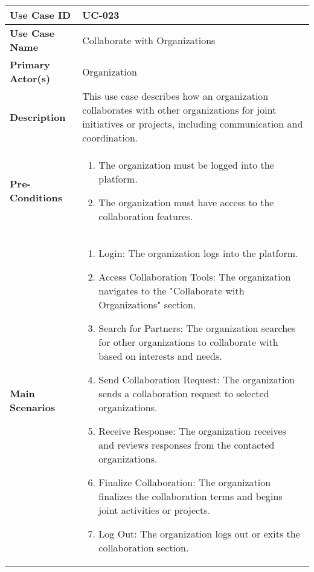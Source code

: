 \begin{table}[!ht]
    \centering
    \renewcommand{\arraystretch}{1.3} %
    \begin{tabularx}{\textwidth}{|l|X|}
        \hline
        \textbf{Use Case ID} & UC-023 \\
        \hline
        \textbf{Use Case Name} & Collaborate with Organizations \\
        \hline
        \textbf{Primary Actor(s)} & Organization \\
        \hline
        \textbf{Description} & This use case describes how an organization collaborates with other organizations for joint initiatives or projects, including communication and coordination. \\
        \hline
        \textbf{Pre-Conditions} & 
        \begin{enumerate}[label=\arabic*.,itemsep=0pt]
            \item The organization must be logged into the platform.
            \item The organization must have access to the collaboration features.
        \end{enumerate} \\
        \hline
        \textbf{Main Scenarios} & 
        \begin{enumerate}[label=\arabic*.,itemsep=0pt]
            \item Login: The organization logs into the platform.
            \item Access Collaboration Tools: The organization navigates to the "Collaborate with Organizations" section.
            \item Search for Partners: The organization searches for other organizations to collaborate with based on interests and needs.
            \item Send Collaboration Request: The organization sends a collaboration request to selected organizations.
            \item Receive Response: The organization receives and reviews responses from the contacted organizations.
            \item Finalize Collaboration: The organization finalizes the collaboration terms and begins joint activities or projects.
            \item Log Out: The organization logs out or exits the collaboration section.
        \end{enumerate} \\

\end{tabularx}
\end{table}
